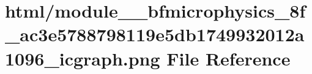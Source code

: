 \hypertarget{module____bfmicrophysics__8f__ac3e5788798119e5db1749932012a1096__icgraph_8png}{}\section{html/module\+\_\+\+\_\+bfmicrophysics\+\_\+8f\+\_\+ac3e5788798119e5db1749932012a1096\+\_\+icgraph.png File Reference}
\label{module____bfmicrophysics__8f__ac3e5788798119e5db1749932012a1096__icgraph_8png}

